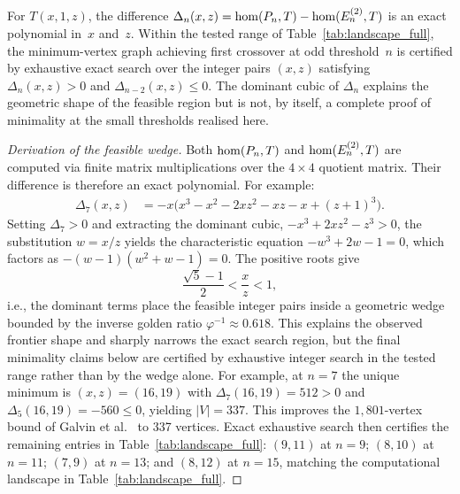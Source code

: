 \begin{compresult}
\label{thm:frontier}
For $T(x,1,z)$, the difference $\Delta_n(x,z) = \mathrm{hom}(P_n, T) -
\mathrm{hom}(E_n^{(2)}, T)$ is an exact polynomial in~$x$ and~$z$.
Within the tested range of Table~\ref{tab:landscape_full}, the
minimum-vertex graph achieving first crossover at odd threshold~$n$
is certified by exhaustive exact search over the integer pairs
$(x,z)$ satisfying $\Delta_n(x,z) > 0$ and $\Delta_{n-2}(x,z) \le 0$.
The dominant cubic of $\Delta_n$ explains the geometric shape of the
feasible region but is not, by itself, a complete proof of minimality
at the small thresholds realised here.
\end{compresult}

\begin{proof}[Derivation of the feasible wedge]
Both $\mathrm{hom}(P_n, T)$ and $\mathrm{hom}(E_n^{(2)}, T)$ are computed via
finite matrix multiplications over the $4 \times 4$ quotient matrix.
Their difference is therefore an exact polynomial.  For example:
\begin{align*}
  \Delta_7(x,z) &= -x\bigl(x^3 - x^2 - 2xz^2 - xz - x + (z+1)^3\bigr).
\end{align*}
Setting $\Delta_7 > 0$ and extracting the dominant cubic,
$-x^3 + 2xz^2 - z^3 > 0$, the substitution $w = x/z$ yields the
characteristic equation $-w^3 + 2w - 1 = 0$, which factors as
$-(w-1)(w^2 + w - 1) = 0$.  The positive roots give
\[
  \frac{\sqrt{5} - 1}{2} < \frac{x}{z} < 1,
\]
i.e., the dominant terms place the feasible integer pairs inside a
geometric wedge bounded by the inverse golden ratio
$\varphi^{-1} \approx 0.618$. This explains the observed frontier
shape and sharply narrows the exact search region, but the final
minimality claims below are certified by exhaustive integer search in
the tested range rather than by the wedge alone. For example, at
$n = 7$ the
unique minimum is $(x,z) = (16,19)$ with $\Delta_7(16,19) = 512 > 0$
and $\Delta_5(16,19) = -560 \le 0$, yielding $|V| = 337$.  This
improves the $1{,}801$-vertex bound of
Galvin et al.~\cite{galvin2025} to 337 vertices. Exact exhaustive search then certifies the remaining entries in
Table~\ref{tab:landscape_full}: $(9,11)$ at $n = 9$; $(8,10)$ at
$n = 11$; $(7,9)$ at $n = 13$; and $(8,12)$ at $n = 15$, matching
the computational landscape in Table~\ref{tab:landscape_full}.
\end{proof}


